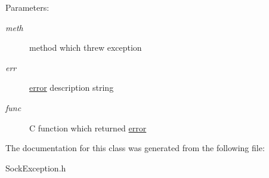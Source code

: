 \begin{Desc}
\item[Parameters:]
\begin{description}
\item[{\em meth}]method which threw exception \item[{\em err}]\hyperlink{classsocketpp_1_1error}{error} description string \item[{\em func}]C function which returned \hyperlink{classsocketpp_1_1error}{error} \end{description}
\end{Desc}


The documentation for this class was generated from the following file:\begin{CompactItemize}
\item 
SockException.h\end{CompactItemize}
